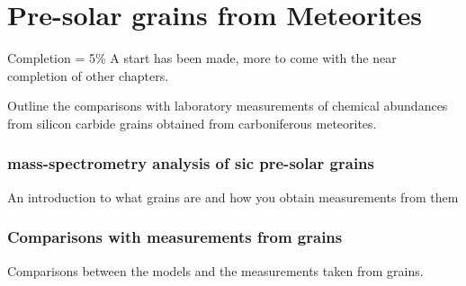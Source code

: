 \chapter{Pre-solar grains from Meteorites}

Completion = 5\%
A start has been made, more to come with the near completion of other chapters.

Outline the comparisons with laboratory measurements of chemical abundances from silicon carbide grains obtained from carboniferous meteorites.

\subsection{mass-spectrometry analysis of \acrfull{sic} pre-solar grains}

An introduction to what grains are and how you obtain measurements from them

\subsection{Comparisons with measurements from grains}

Comparisons between the models and the measurements taken from grains.